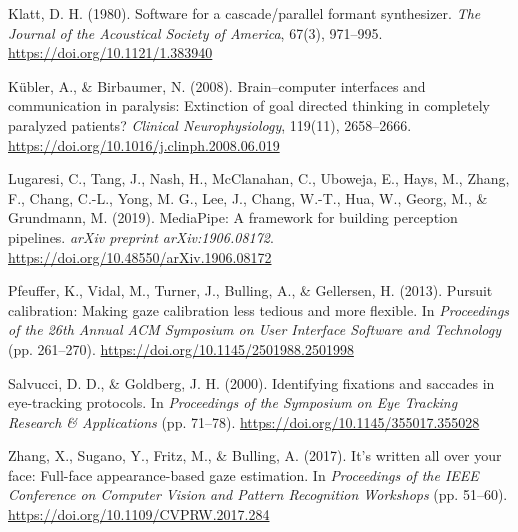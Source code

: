 \documentclass[twocolumn,10pt]{article}
\begin{document}
\begin{description}
    \item Klatt, D. H. (1980). Software for a cascade/parallel formant synthesizer. \textit{The Journal of the Acoustical Society of America}, 67(3), 971--995. \url{https://doi.org/10.1121/1.383940}
    \item K{\"u}bler, A., \& Birbaumer, N. (2008). Brain--computer interfaces and communication in paralysis: Extinction of goal directed thinking in completely paralyzed patients? \textit{Clinical Neurophysiology}, 119(11), 2658--2666. \url{https://doi.org/10.1016/j.clinph.2008.06.019}
    \item Lugaresi, C., Tang, J., Nash, H., McClanahan, C., Uboweja, E., Hays, M., Zhang, F., Chang, C.-L., Yong, M. G., Lee, J., Chang, W.-T., Hua, W., Georg, M., \& Grundmann, M. (2019). MediaPipe: A framework for building perception pipelines. \textit{arXiv preprint arXiv:1906.08172}. \url{https://doi.org/10.48550/arXiv.1906.08172}
    \item Pfeuffer, K., Vidal, M., Turner, J., Bulling, A., \& Gellersen, H. (2013). Pursuit calibration: Making gaze calibration less tedious and more flexible. In \textit{Proceedings of the 26th Annual ACM Symposium on User Interface Software and Technology} (pp. 261--270). \url{https://doi.org/10.1145/2501988.2501998}
    \item Salvucci, D. D., \& Goldberg, J. H. (2000). Identifying fixations and saccades in eye-tracking protocols. In \textit{Proceedings of the Symposium on Eye Tracking Research \& Applications} (pp. 71--78). \url{https://doi.org/10.1145/355017.355028}
    \item Zhang, X., Sugano, Y., Fritz, M., \& Bulling, A. (2017). It's written all over your face: Full-face appearance-based gaze estimation. In \textit{Proceedings of the IEEE Conference on Computer Vision and Pattern Recognition Workshops} (pp. 51--60). \url{https://doi.org/10.1109/CVPRW.2017.284}
\end{description}
\end{document}
